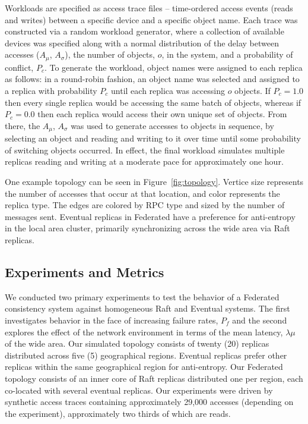 \documentclass[10pt,conference,letterpaper]{IEEEtran}
\begin{document}
Workloads are specified as access trace files -- time-ordered access events (reads and
writes) between a specific device and a specific object name.
Each trace was constructed via a random workload generator, where a collection of
available devices was specified along with a normal distribution of the delay between
accesses ($A_{\mu}$, $A_{\sigma}$), the number of objects, $o$, in the system, and a
probability of conflict, $P_c$.
To generate the workload, object names were assigned to each replica as follows: in a
round-robin fashion, an object name was selected and assigned to a replica with
probability $P_c$ until each replica was accessing $o$ objects.
If $P_c = 1.0$ then every single replica would be accessing the same batch of objects,
whereas if $P_c = 0.0$ then each replica would access their own unique set of objects.
From there, the $A_{\mu}$, $A_{\sigma}$ was used to generate accesses to objects in
sequence, by selecting an object and reading and writing to it over time until some
probability of switching objects occurred.
In effect, the final workload simulates multiple replicas reading and writing at a
moderate pace for approximately one hour.

One example topology can be seen in Figure~\ref{fig:topology}.
Vertice size represents the number of
accesses that occur at that location, and color represents the
replica type.
The edges are colored by RPC type and sized by the
number of messages sent.
Eventual replicas in Federated have a preference for anti-entropy in the local
area cluster, primarily synchronizing across the wide area via Raft replicas.

\subsection{Experiments and Metrics}

We conducted two primary experiments to test the behavior of a Federated consistency
system against homogeneous Raft and Eventual systems.
The first investigates behavior in the face of increasing failure rates, $P_f$ and the
second explores the effect of the network environment in terms of the mean latency,
$\lambda{\mu}$ of the wide area.
Our simulated topology consists of twenty (20) replicas distributed across five (5)
geographical regions.
Eventual replicas prefer other replicas within the same geographical region for
anti-entropy.
Our Federated topology consists of an inner core of Raft replicas distributed one per region,
each co-located with several eventual replicas.
Our experiments were driven by synthetic access traces containing approximately 29,000
accesses (depending on the experiment), approximately two thirds of which are reads.
\end{document}
